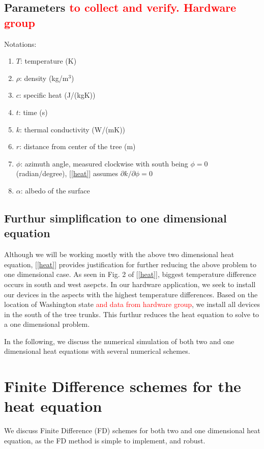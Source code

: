 \documentclass[12pt]{article}
\begin{document}
\subsection{Parameters \textcolor{red}{to collect and verify. Hardware group}}
Notations: 
\begin{enumerate}
\item $T$: temperature (K)
\item $\rho$: density (kg/m$^3$)
\item $c$: specific heat (J/(kgK))
\item $t$: time (s)
\item $k$: thermal conductivity (W/(mK))
\item $r$: distance from center of the tree (m)
\item $\phi$: azimuth angle, measured clockwise with south being $\phi=0$ (radian/degree), [\ref{heat}] assumes $\partial k/\partial \phi=0$
\item $\alpha$: albedo of the surface
\end{enumerate}

\subsection{Furthur simplification to one dimensional equation}
Although we will be working mostly with the above two dimensional heat equation, [\ref{heat}] provides justification for further reducing the above problem to one dimensional case. As seen in Fig. 2 of [\ref{heat}], biggest temperature difference occurs in south and west asepcts. In our hardware application, we seek to install our devices in the aspects with the highest temperature differences. Based on the location of Washington state \textcolor{red}{and data from hardware group}, we install all devices in the south of the tree trunks. This furthur reduces the heat equation to solve to a one dimensional problem. 

In the following, we discuss the numerical simulation of both two and one dimensional heat equations with several numerical schemes. 



\section{Finite Difference schemes for the heat equation}
We discuss Finite Difference (FD) schemes for both two and one dimensional heat equation, as the FD method is simple to implement, and robust.  
\end{document}
